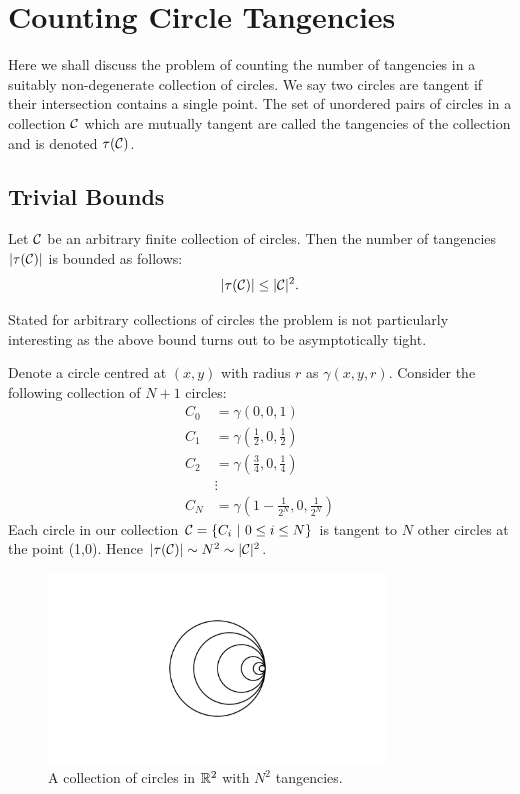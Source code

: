 \chapter{Counting Circle Tangencies\label{chap:circle}}

Here we shall discuss the problem of counting the number of tangencies in a suitably non-degenerate collection of circles. We say two circles are tangent if their intersection contains a single point.
The set of unordered pairs of circles in a collection $\mathcal C$ which are mutually tangent are called the tangencies of the collection and is denoted $\tau(\mathcal C)$. 
\section{Trivial Bounds}
\begin{theorem} \label{thm:trivial-circle-bound}
    Let $\mathcal C$ be an arbitrary finite collection of circles. Then the number of tangencies $|\tau(\mathcal C)|$ is bounded as follows:
    \[
        |\tau(\mathcal C)| \leq |\mathcal C|^2.
    \] 
\end{theorem}
Stated for arbitrary collections of circles the problem is not particularly interesting as the above bound turns out to be asymptotically tight. 
\begin{example}
Denote a circle centred at $(x,y)$ with radius $r$ as $\gamma (x,y,r)$.
Consider the following collection of $N+1$ circles:
\begin{align*}
    C_0 &= \gamma\left(0,0,1\right) \\
    C_1 &= \gamma\left(\frac{1}{2},0,\frac{1}{2}\right) \\
    C_2 &= \gamma\left(\frac{3}{4},0, \frac{1}{4}\right) \\
    &\vdots \\
    C_N &= \gamma\left(1- \frac{1}{2^N}, 0, \frac{1}{2^N}\right)
\end{align*}
Each circle in our collection $\mathcal C = \{ C_i \ | \ 0 \leq i \leq N\}$ is tangent to $N$ other circles at the point (1,0). 
Hence $|\tau(\mathcal C)| \sim N^2 \sim |\mathcal C|^2$. 
\begin{figure}[h]
    \centering 
    \includegraphics[width=0.8\textwidth]{images/circles_degen_case_ManimCE_v0.15.1.png}
    \caption{A collection of circles in $\mathbb R^2$ with $N^2$ tangencies.}
    \end{figure}
\end{example}

